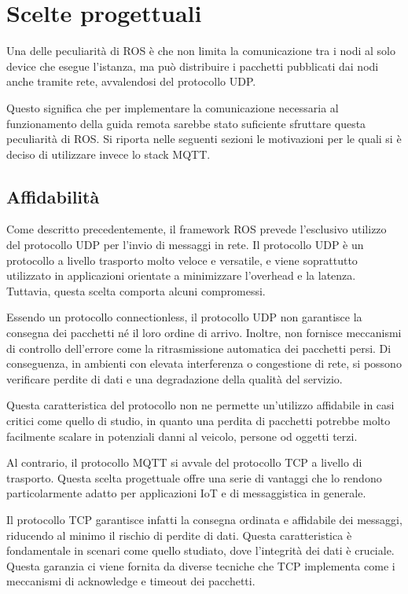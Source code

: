 \chapter{Scelte progettuali}
Una delle peculiarità di ROS è che non limita la comunicazione tra i nodi al solo device che esegue l'istanza, ma può distribuire i pacchetti pubblicati dai nodi anche tramite rete, avvalendosi del protocollo UDP. 

Questo significa che per implementare la comunicazione necessaria al funzionamento della guida remota sarebbe stato suficiente sfruttare questa peculiarità di ROS. Si riporta nelle seguenti sezioni le motivazioni per le quali si è deciso di utilizzare invece lo stack MQTT.

\section{Affidabilità} \label{scelte_progettuali_affidabilità}
Come descritto precedentemente, il framework ROS prevede l'esclusivo utilizzo del protocollo UDP per l'invio di messaggi in rete. Il protocollo UDP è un protocollo a livello trasporto molto veloce e versatile, e viene soprattutto utilizzato in applicazioni orientate a minimizzare l'overhead e la latenza. Tuttavia, questa scelta comporta alcuni compromessi. 

\noindent Essendo un protocollo connectionless, il protocollo UDP non garantisce la consegna dei pacchetti né il loro ordine di arrivo. Inoltre, non fornisce meccanismi di controllo dell'errore come la ritrasmissione automatica dei pacchetti persi. Di conseguenza, in ambienti con elevata interferenza o congestione di rete, si possono verificare perdite di dati e una degradazione della qualità del servizio.

\noindent Questa caratteristica del protocollo non ne permette un'utilizzo affidabile in casi critici come quello di studio, in quanto una perdita di pacchetti potrebbe molto facilmente scalare in potenziali danni al veicolo, persone od oggetti terzi.

\noindent Al contrario, il protocollo MQTT si avvale del protocollo TCP a livello di trasporto. Questa scelta progettuale offre una serie di vantaggi che lo rendono particolarmente adatto per applicazioni IoT e di messaggistica in generale.

\noindent Il protocollo TCP garantisce infatti la consegna ordinata e affidabile dei messaggi, riducendo al minimo il rischio di perdite di dati. Questa caratteristica è fondamentale in scenari come quello studiato, dove l'integrità dei dati è cruciale. Questa garanzia ci viene fornita da diverse tecniche che TCP implementa come i meccanismi di acknowledge e timeout dei pacchetti. 

